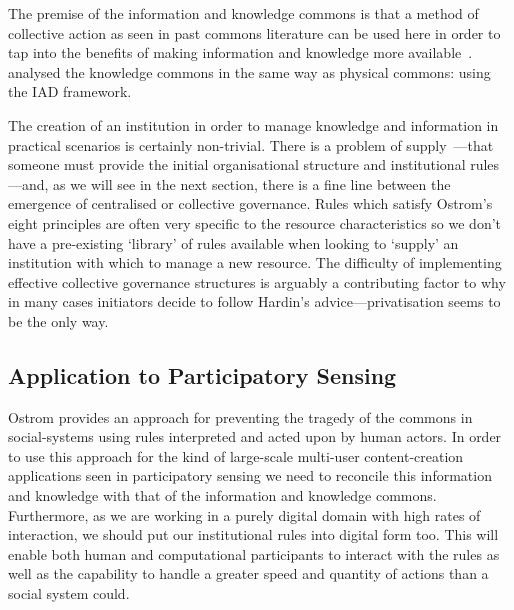 
The premise of the information and knowledge commons is that a method of collective action as seen in past commons literature can be used here in order to tap into the benefits of making information and knowledge more available~\citep{Hess2007,MayoFusterMorell2010,Shadbolt2013}. \citet{Ostrom2007a} analysed the knowledge commons in the same way as physical commons: using the \ac{IAD} framework.

The creation of an institution in order to manage knowledge and information in practical scenarios is certainly non-trivial. 
There is a problem of supply~\cite[p. 42]{Ostrom1990}---that someone must provide the initial organisational structure and institutional rules---and, as we will see in the next section, there is a fine line between the emergence of centralised or collective governance. 
Rules which satisfy Ostrom's eight principles are often very specific to the resource characteristics so we don't have a pre-existing `library' of rules available when looking to `supply' an institution with which to manage a new resource. 
The difficulty of implementing effective collective governance structures is arguably a contributing factor to why in many cases initiators decide to follow Hardin's advice---privatisation seems to be the only way.

\subsection{Application to Participatory Sensing}

Ostrom provides an approach for preventing the tragedy of the commons in social-systems using rules interpreted and acted upon by human actors. 
In order to use this approach for the kind of large-scale multi-user content-creation applications seen in participatory sensing we need to reconcile this information and knowledge with that of the information and knowledge commons. 
Furthermore, as we are working in a purely digital domain with high rates of interaction, we should put our institutional rules into digital form too. 
This will enable both human and computational participants to interact with the rules as well as the capability to handle a greater speed and quantity of actions than a social system could.

